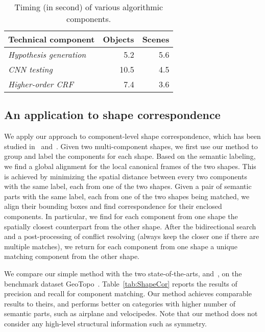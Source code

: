 \documentclass[acmtog]{acmart}
\newcommand{\new}[1]{{\color{black}#1}}
\begin{document}
\begin{table}[!ht]
\caption{\new{Timing (in second) of various algorithmic components.}}
\centering
  \begin{tabular}{lrr}
    \hline
     Technical component & Objects &  Scenes \\
    \hline
    \textsl{Hypothesis generation}   & 5.2 & 5.6 \\
    \textsl{CNN testing} & 10.5 & 4.5 \\
    \textsl{Higher-order CRF}         & 7.4 & 3.6 \\
    \hline
  \end{tabular}
\label{tab:timing}
\end{table}


\subsection{An application to shape correspondence}
\new{
We apply our approach to component-level shape correspondence, which has been studied in~\cite{Alhashim_2015}
and~\cite{Zhu_2017}.
Given two multi-component shapes, we first use our method to group and label the components for each shape.
Based on the semantic labeling, we find a global alignment for the local canonical frames of the two shapes.
This is achieved by minimizing the spatial distance between every two components with the same label,
each from one of the two shapes.
Given a pair of semantic parts with the same label, each from one of the two shapes being matched,
we align their bounding boxes and find correspondence for their enclosed components.
In particular, we find for each component from one shape
the spatially closest counterpart from the other shape.
After the bidirectional search and a post-processing of conflict resolving (always keep the closer
one if there are multiple matches), we return for each component from one shape
a unique matching component from the other shape.

We compare our simple method with the two state-of-the-arts, \cite{Alhashim_2015} and~\cite{Zhu_2017},
on the benchmark dataset GeoTopo~\cite{Alhashim_2015}.
Table~\ref{tab:ShapeCor} reports the results of precision and recall for component matching.
Our method achieves comparable results to theirs, and performs better on categories with
higher number of semantic parts, such as airplane and velocipedes.
Note that our method does not consider any high-level structural information such as symmetry.}
\end{document}
